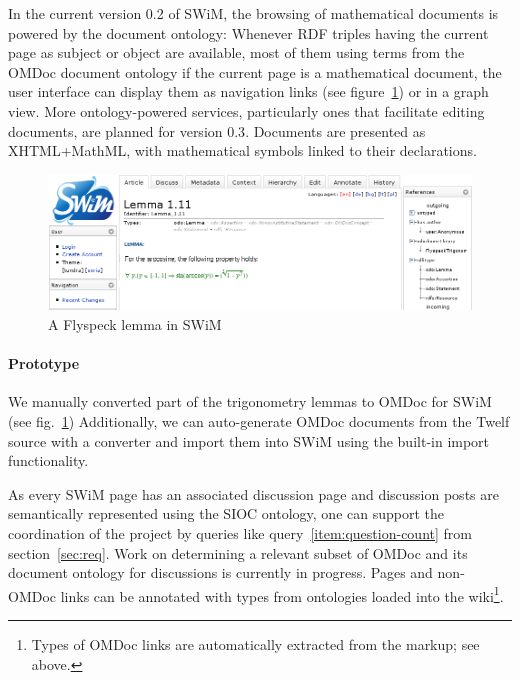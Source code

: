 In the current version 0.2 of SWiM, the browsing of mathematical documents is
powered by the document ontology: Whenever RDF triples having the current page
as subject or object are available, most of them using terms from the OMDoc
document ontology if the current page is a mathematical document, the
 user interface can display them as navigation links (see
figure~\ref{fig:swim-lemma}) or in a graph view.  More ontology-powered
services, particularly ones that facilitate editing documents, are planned for
version 0.3\cite{swim-roadmap,Lange:SWiMSciColl07}.  Documents are presented as
XHTML+MathML, with mathematical symbols linked to their declarations.

\begin{figure}
  \centering
  \includegraphics[width=\textwidth]{images/swim-lemma}
  \caption{A Flyspeck lemma in SWiM}
  \label{fig:swim-lemma}
\end{figure}

\paragraph{Prototype} We manually converted part of the trigonometry lemmas to
OMDoc for SWiM (see fig.\ \ref{fig:swim-lemma})  Additionally,
we can auto-generate OMDoc documents from the Twelf source with a converter and
import them into SWiM using the built-in import functionality.

As every SWiM page has an associated discussion page and discussion posts are
semantically represented using the SIOC ontology\cite{SIOC:web}, one can support
the coordination of the project by queries like query~\ref{item:question-count}
from section~\ref{sec:req}.  Work on determining a relevant subset of OMDoc and
its document ontology for discussions is currently in progress.  Pages and non-OMDoc
links can be annotated with types from ontologies loaded into the
wiki\footnote{Types of OMDoc links are automatically extracted from the markup;
  see above.}.

